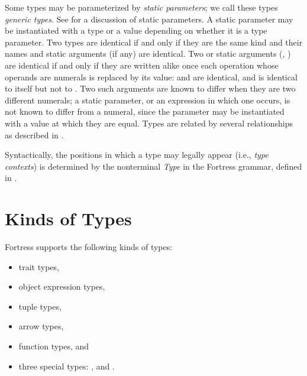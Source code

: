 Some types may be parameterized by \emph{static parameters};
we call these types \emph{generic types}.
See  for a discussion of static parameters.
A static parameter may be instantiated with a type or a value
depending on whether it is a type parameter.
Two types are identical if and only if they are the same kind and
their names and static arguments (if any) are identical.
Two  or  static arguments
(, )
are identical if and only if they are written alike
once each operation whose operands are numerals is replaced by its value:
 and  are identical,
and  is identical to itself but not to .
Two such arguments are known to differ when they are two different numerals;
a static parameter, or an expression in which one occurs,
is not known to differ from a numeral,
since the parameter may be instantiated with a value at which they are equal.
Types are related by several relationships as described in
.

Syntactically,
the positions in which a type may legally appear (i.e., \emph{type contexts})
is determined by the nonterminal \emph{Type} in the Fortress grammar,
defined in .


\section{Kinds of Types}

Fortress supports the following kinds of types:
\begin{itemize}

\item
trait types,

\item
object expression types,

\item
tuple types,

\item
arrow types,

\item
function types, and

\item
three special types:
,  and \TYP{()}.

\end{itemize}

